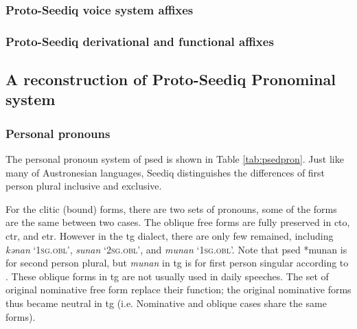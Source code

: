 \subsubsection{Proto-Seediq voice system affixes}
\lipsum[1]

\subsubsection{Proto-Seediq derivational and functional affixes}
\lipsum[1]

\subsection{A reconstruction of Proto-Seediq Pronominal system}
\lipsum[1]

\subsubsection{Personal pronouns}

The personal pronoun system of \acl{psed} is shown in Table \ref{tab:psedpron}. Just like many of Austronesian languages, Seediq distinguishes the differences of first person plural inclusive and exclusive. 

For the clitic (bound) forms, there are two sets of pronouns, some of the forms are the same between two cases. The oblique free forms are fully preserved in \acl{cto}, \acl{ctr}, and \acl{etr}. However in the \acl{tg} dialect, there are only few remained, including \textit{kənan} `\textsc{1sg.obl}', \textit{sunan} `\textsc{2sg.obl}', and \textit{munan} `\textsc{1sg.obl}'. Note that \acl{psed} *munan is for second person plural, but \textit{munan} in \acl{tg} is for first person singular according to \textcite[62]{Sung2018Sedgrammar}. These oblique forms in \acl{tg} are not usually used in daily speeches. The set of original nominative free form replace their function; the original nominative forms thus became neutral in \acl{tg} (i.e. Nominative and oblique cases share the same forms).

